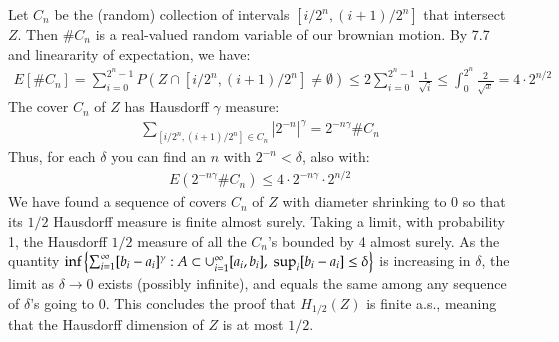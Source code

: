 \documentclass[12pt]{article}
\theoremstyle{definitionstyle}
\newcommand{\SET}[1]{\Set{\mskip-\medmuskip #1 \mskip-\medmuskip}}
\newcommand{\1}{\mathds 1}
\begin{document}
    Let $C_n$ be the (random) collection of intervals $[i/2^n, (i+1)/2^n]$ that intersect $Z$. Then $\# C_n$ is a real-valued random variable of our brownian motion. By 7.7 and lineararity of expectation, we have:
    \begin{align*}
        E[\# C_n] = \sum_{i=0}^{2^n - 1} P(Z \cap [i/2^n, (i+1)/2^n] \neq \emptyset) \leq 2\sum_{i=0}^{2^n - 1} \frac{1}{\sqrt{i}} \leq \int_0^{2^n} \frac{2}{\sqrt{x}} = 4 \cdot 2^{n/2}
    \end{align*}
    The cover $C_n$ of $Z$ has Hausdorff $\gamma$ measure:
    \begin{align*}
        \sum_{[i/2^n, (i+1)/2^n] \in C_n} |2^{-n}|^{\gamma} = 2^{-n \gamma} \# C_n
    \end{align*}
    Thus, for each $\delta$ you can find an $n$ with $2^{-n} < \delta$, also with:
    \begin{align*}
        E(2^{-n \gamma} \# C_n) \leq 4 \cdot 2^{-n \gamma} \cdot 2^{n/2}
    \end{align*}
    We have found a sequence of covers $C_n$ of $Z$ with diameter shrinking to 0 so that its $1/2$ Hausdorff measure is finite almost surely. Taking a limit, with probability 1, the Hausdorff $1/2$ measure of all the $C_n$'s bounded by 4 almost surely. As the quantity $\inf \SET{\sum_{i=1}^\infty [b_i-a_i]^\gamma : A \subset \cup_{i=1}^\infty [a_i,b_i], \; \sup_i [b_i-a_i] \leq \delta }$ is increasing in $\delta$, the limit as $\delta \to 0$ exists (possibly infinite), and equals the same among any sequence of $\delta$'s going to 0. This concludes the proof that $H_{1/2}(Z)$ is finite a.s., meaning that the Hausdorff dimension of $Z$ is at most $1/2$. 
\end{document}

